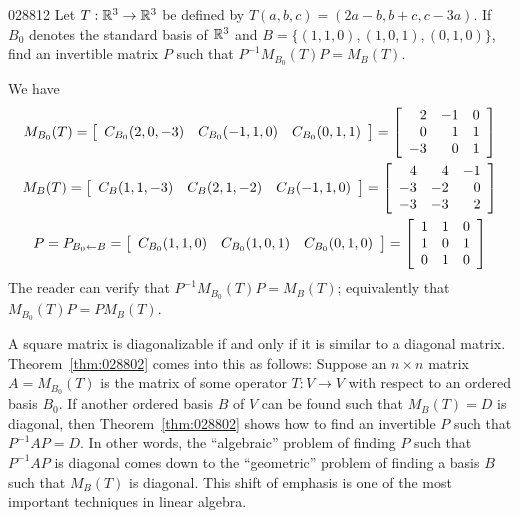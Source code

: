\begin{example}{}{028812}
Let $T : \mathbb{R}^3 \to \mathbb{R}^3$ be defined by $T(a, b, c) = (2a - b, b + c, c - 3a)$. If $B_{0}$ denotes the standard basis of $\mathbb{R}^3$ and $B = \{(1, 1, 0), (1, 0, 1), (0, 1, 0)\}$, find an invertible matrix $P$ such that $P^{-1}M_{B_0}(T)P = M_B(T)$.


\begin{solution}
 We have
\begin{gather*}
M_{B_0}(T) = \left[ \begin{array}{ccc} C_{B_0}(2, 0, -3) & C_{B_0}(-1, 1, 0) & C_{B_0}(0, 1, 1) \end{array} \right] = \left[ \begin{array}{rrr} 2 & -1 & 0 \\ 0 & 1 & 1 \\ -3 & 0 & 1 \end{array} \right] \\
M_{B}(T) = \left[ \begin{array}{ccc} C_{B}(1, 1, -3) & C_{B}(2, 1, -2) & C_{B}(-1, 1, 0) \end{array} \right] = \left[ \begin{array}{rrr} 4 & 4 & -1 \\ -3 & -2 & 0 \\ -3 & -3 & 2 \end{array} \right] \\
P = P_{B_0 \gets B} = \left[ \begin{array}{ccc} C_{B_0}(1, 1, 0) & C_{B_0}(1, 0, 1) & C_{B_0}(0, 1, 0) \end{array} \right] = \left[ \begin{array}{rrr} 1 & 1 & 0 \\ 1 & 0 & 1 \\ 0 & 1 & 0 \end{array} \right]
\end{gather*}
The reader can verify that $P^{-1}M_{B_0}(T)P = M_B(T)$; equivalently that $M_{B_0}(T)P = PM_B(T)$.
\end{solution}
\end{example}

A square matrix is diagonalizable if and only if it is similar to a diagonal matrix. Theorem~\ref{thm:028802} comes into this as follows: Suppose an $n \times n$ matrix $A = M_{B_0}(T)$ is the matrix of some operator $T : V \to V$ with respect to an ordered basis $B_{0}$. If another ordered basis $B$ of $V$ can be found such that $M_{B}(T) = D$ is diagonal, then Theorem~\ref{thm:028802} shows how to find an invertible $P$ such that $P^{-1}AP = D$. In other words, the ``algebraic'' problem of finding $P$ such that $P^{-1}AP$ is diagonal comes down to the ``geometric'' problem of finding a basis $B$ such that $M_{B}(T)$ is diagonal. This shift of emphasis is one of the most important techniques in linear algebra.


